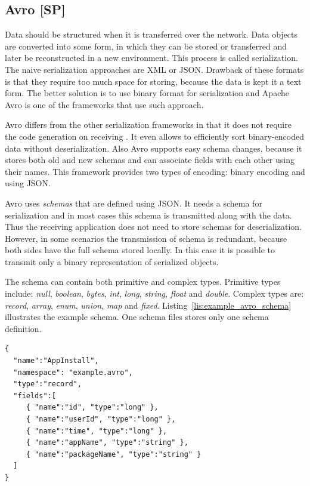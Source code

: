 \subsection{Avro [SP]}
\label{subs:avro}

Data should be structured when it is transferred over the network.
Data objects are converted into some form, in which they can be stored or transferred and later be reconstructed in a new environment.
This process is called serialization.
The naive serialization approaches are XML or JSON.
Drawback of these formats is that they require too much space for storing, because the data is kept it a text form.
The better solution is to use binary format for serialization and Apache Avro is one of the frameworks that use such approach.

Avro differs from the other serialization frameworks in that it does not require the code generation on receiving \cite{Avro1}.
It even allows to efficiently sort binary-encoded data without deserialization.
Also Avro supports easy schema changes, because it stores both old and new schemas and can associate fields with each other using their names.
This framework provides two types of encoding: binary encoding and using JSON.

Avro uses \textit{schemas} that are defined using JSON.
It needs a schema for serialization and in most cases this schema is transmitted along with the data.
Thus the receiving application does not need to store schemas for deserialization.
However, in some scenarios the transmission of schema is redundant, because both sides have the full schema stored locally.
In this case it is possible to transmit only a binary representation of serialized objects.

The schema can contain both primitive and complex types.
Primitive types include: \textit{null}, \textit{boolean}, \textit{bytes}, \textit{int}, \textit{long}, \textit{string}, \textit{float} and \textit{double}.
Complex types are: \textit{record}, \textit{array}, \textit{enum}, \textit{union}, \textit{map} and \textit{fixed}.
Listing~\ref{lis:example_avro_schema} illustrates the example schema.
One schema files stores only one schema definition.

\begin{lstlisting}[caption=Avro schema (example), label=lis:example_avro_schema]
{
  "name":"AppInstall",
  "namespace": "example.avro",
  "type":"record",
  "fields":[
     { "name":"id", "type":"long" },
     { "name":"userId", "type":"long" },
     { "name":"time", "type":"long" },
     { "name":"appName", "type":"string" },
     { "name":"packageName", "type":"string" }
  ]
}
\end{lstlisting}

